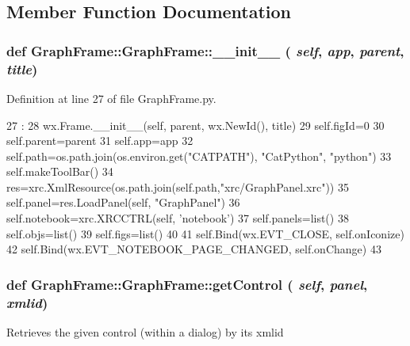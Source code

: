 \subsection{Member Function Documentation}
\hypertarget{classGraphFrame_1_1GraphFrame_a55d22ecce4afd645d1358ff0f5e56c66}{
\subsubsection[{\_\-\_\-init\_\-\_\-}]{\setlength{\rightskip}{0pt plus 5cm}def GraphFrame::GraphFrame::\_\-\_\-init\_\-\_\- ( {\em self}, \/   {\em app}, \/   {\em parent}, \/   {\em title})}}
\label{classGraphFrame_1_1GraphFrame_a55d22ecce4afd645d1358ff0f5e56c66}


Definition at line 27 of file GraphFrame.py.


\begin{DoxyCode}
27                                        : 
28         wx.Frame.__init__(self, parent, wx.NewId(), title)
29         self.figId=0
30         self.parent=parent
31         self.app=app
32         self.path=os.path.join(os.environ.get("CATPATH"), "CatPython", "python")
33         self.makeToolBar()
34         res=xrc.XmlResource(os.path.join(self.path,"xrc/GraphPanel.xrc"))
35         self.panel=res.LoadPanel(self, "GraphPanel")
36         self.notebook=xrc.XRCCTRL(self, 'notebook')
37         self.panels=list()
38         self.objs=list()
39         self.figs=list()
40 
41         self.Bind(wx.EVT_CLOSE, self.onIconize)
42         self.Bind(wx.EVT_NOTEBOOK_PAGE_CHANGED, self.onChange)
43 
\end{DoxyCode}
\hypertarget{classGraphFrame_1_1GraphFrame_a32e99f5b3802b5a8f1cb92a87b3792fd}{
\subsubsection[{getControl}]{\setlength{\rightskip}{0pt plus 5cm}def GraphFrame::GraphFrame::getControl ( {\em self}, \/   {\em panel}, \/   {\em xmlid})}}
\label{classGraphFrame_1_1GraphFrame_a32e99f5b3802b5a8f1cb92a87b3792fd}
\begin{DoxyVerb}Retrieves the given control (within a dialog) by its xmlid\end{DoxyVerb}
 

